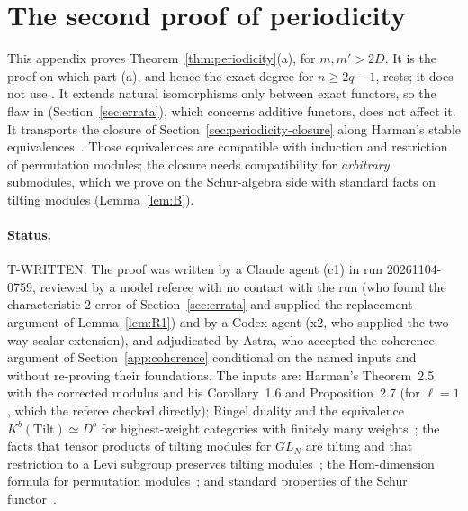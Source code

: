 
\section{The second proof of periodicity}\label{app:tilting}

This appendix proves Theorem~\ref{thm:periodicity}(a), for $m,m'>2D$.  It is the proof on
which part (a), and hence the exact degree for $n\ge2q-1$, rests; it does not use
\cite{hone2025}.  It extends natural isomorphisms only between exact functors, so the flaw in
\cite[Lemma~8.2.1]{hone2025} (Section~\ref{sec:errata}), which concerns additive functors, does
not affect it.  It transports the closure of Section~\ref{sec:periodicity-closure} along
Harman's stable equivalences~\cite{harman2015}.  Those equivalences are compatible with
induction and restriction of permutation modules; the closure needs compatibility for
\emph{arbitrary} submodules, which we prove on the Schur-algebra side with standard facts on
tilting modules (Lemma~\ref{lem:B}).

\paragraph{Status.}  T-WRITTEN.  The proof was written by a Claude agent (c1) in run
20261104-0759, reviewed by a model referee with no contact with the run (who found the
characteristic-$2$ error of Section~\ref{sec:errata} and supplied the replacement argument of
Lemma~\ref{lem:R1}) and by a Codex agent (x2, who supplied the two-way scalar extension), and
adjudicated by Astra, who accepted the coherence argument of Section~\ref{app:coherence}
conditional on the named inputs and without re-proving their foundations.  The inputs are:
Harman's Theorem~2.5 with the corrected modulus and his Corollary~1.6 and Proposition~2.7
(for $\ell=1$, which the referee checked directly); Ringel duality and the equivalence
$K^b(\mathrm{Tilt})\simeq D^b$ for highest-weight categories with finitely many
weights~\cite{ringel1991,happel1988}; the facts that tensor products of tilting modules for
$GL_N$ are tilting and that restriction to a Levi subgroup preserves tilting
modules~\cite{wang1982,donkin1998,mathieu1990}; the Hom-dimension formula for permutation
modules~\cite[13.19]{james1978}; and standard properties of the Schur
functor~\cite{green1980}.

